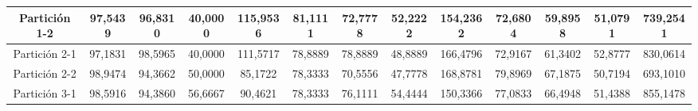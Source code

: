 \documentclass[12pt]{article}
\begin{document}
\begin{table}[H]
{\begin{tabular}{|c|cccc|cccc|cccc|}
Partición 1-2 & \multicolumn{1}{c|}{97,5439}                                                  & \multicolumn{1}{c|}{96,8310}                                                 & \multicolumn{1}{c|}{40,0000} & 115,9536 & \multicolumn{1}{c|}{81,1111}                                                  & \multicolumn{1}{c|}{72,7778}                                                 & \multicolumn{1}{c|}{52,2222} & 154,2362 & \multicolumn{1}{c|}{72,6804}                                                  & \multicolumn{1}{c|}{59,8958}                                                 & \multicolumn{1}{c|}{51,0791} & 739,2541 \\ \hline
Partición 2-1 & \multicolumn{1}{c|}{97,1831}                                                  & \multicolumn{1}{c|}{98,5965}                                                 & \multicolumn{1}{c|}{40,0000} & 111,5717 & \multicolumn{1}{c|}{78,8889}                                                  & \multicolumn{1}{c|}{78,8889}                                                 & \multicolumn{1}{c|}{48,8889} & 166,4796 & \multicolumn{1}{c|}{72,9167}                                                  & \multicolumn{1}{c|}{61,3402}                                                 & \multicolumn{1}{c|}{52,8777} & 830,0614 \\ \hline
Partición 2-2 & \multicolumn{1}{c|}{98,9474}                                                  & \multicolumn{1}{c|}{94,3662}                                                 & \multicolumn{1}{c|}{50,0000} & 85,1722  & \multicolumn{1}{c|}{78,3333}                                                  & \multicolumn{1}{c|}{70,5556}                                                 & \multicolumn{1}{c|}{47,7778} & 168,8781 & \multicolumn{1}{c|}{79,8969}                                                  & \multicolumn{1}{c|}{67,1875}                                                 & \multicolumn{1}{c|}{50,7194} & 693,1010 \\ \hline
Partición 3-1 & \multicolumn{1}{c|}{98,5916}                                                  & \multicolumn{1}{c|}{94,3860}                                                 & \multicolumn{1}{c|}{56,6667} & 90,4621  & \multicolumn{1}{c|}{78,3333}                                                  & \multicolumn{1}{c|}{76,1111}                                                 & \multicolumn{1}{c|}{54,4444} & 150,3366 & \multicolumn{1}{c|}{77,0833}                                                  & \multicolumn{1}{c|}{66,4948}                                                 & \multicolumn{1}{c|}{51,4388} & 855,1478 \\ \hline

\end{tabular}}
\end{table}
\end{document}
